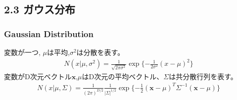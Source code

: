 \documentclass[dvipdfmx]{beamer}
\theoremstyle{definition}
\begin{document}
\subsection{2.3 ガウス分布}
\begin{frame}
  \frametitle{Gaussian Distribution}
  変数が一つ, $\mu$は平均,$\sigma^2$は分散を表す。
  \begin{gather*}
     N(x|\mu, \sigma^2) = \frac{1}{\sqrt{2\pi \sigma^2}}\exp\{-\frac{1}{2\sigma^2}(x-\mu)^2 \} 
  \end{gather*}
  変数がD次元ベクトル$\bm{x}$,$\mu$はD次元の平均ベクトル、$\Sigma$は共分散行列を表す。
  \begin{gather*}
     N(x|\mu, \Sigma) = \frac{1}{(2\pi)^{D/2}}\frac{1}{|\Sigma|^{1/2}}\exp\{-\frac{1}{2}(\bm{x}-\mu)^{T} \Sigma^{-1} (\bm{x}-\mu) \} 
  \end{gather*}
\end{frame}

\begin{frame}
  \frametitle{}
\end{frame}
\end{document}
